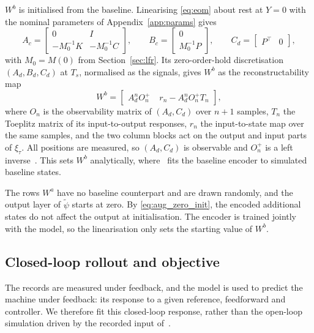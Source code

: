 $W^b$ is initialised from the baseline.
Linearising \eqref{eq:eom} about rest at $Y=0$ with the nominal parameters
of Appendix~\ref{app:params} gives
\begin{equation}
 A_c=\begin{bmatrix}0 & I\\ -M_0^{-1}K & -M_0^{-1}C\end{bmatrix},\qquad
 B_c=\begin{bmatrix}0\\ M_0^{-1}P\end{bmatrix},\qquad
 C_d=\begin{bmatrix}P^\top & 0\end{bmatrix},
\label{eq:aug_lin}
\end{equation}
with $M_0=M(0)$ from Section~\ref{sec:lfr}.
Its zero-order-hold discretisation $(A_d,B_d,C_d)$ at $T_s$, normalised as
the signals, gives $W^b$ as the reconstructability
map~\cite[Eqs.~(16), (17)]{hoekstra2026encoder}
\begin{equation}
 W^b=\begin{bmatrix}
  A_d^nO_n^{+} & \;r_n-A_d^nO_n^{+}T_n
 \end{bmatrix},
 \label{eq:aug_wb}
\end{equation}
where $O_n$ is the observability matrix of $(A_d,C_d)$ over $n+1$ samples,
$T_n$ the Toeplitz matrix of its input-to-output responses, $r_n$ the
input-to-state map over the same samples, and the two column blocks act on
the output and input parts of $\xi_\tau$.
All positions are measured, so $(A_d,C_d)$ is observable and $O_n^{+}$ is a
left inverse~\cite[Sec.~3.1]{hoekstra2026encoder}.
This sets $W^b$ analytically, where~\cite[Eq.~(30)]{hoekstra2026lfr} fits
the baseline encoder to simulated baseline states.

The rows $W^a$ have no baseline counterpart and are drawn randomly, and the
output layer of $\tilde\psi$ starts at zero.
By \eqref{eq:aug_zero_init}, the encoded additional states do not affect
the output at initialisation.
The encoder is trained jointly with the model, so the linearisation only
sets the starting value of $W^b$.

\subsection{Closed-loop rollout and objective}\label{sec:aug_closed_loop}
The records are measured under feedback, and the model is used to predict
the machine under feedback: its response to a given reference, feedforward
and controller.
We therefore fit this closed-loop response, rather than the open-loop
simulation driven by the recorded input of~\cite[Eq.~(22)]{hoekstra2026lfr}.

